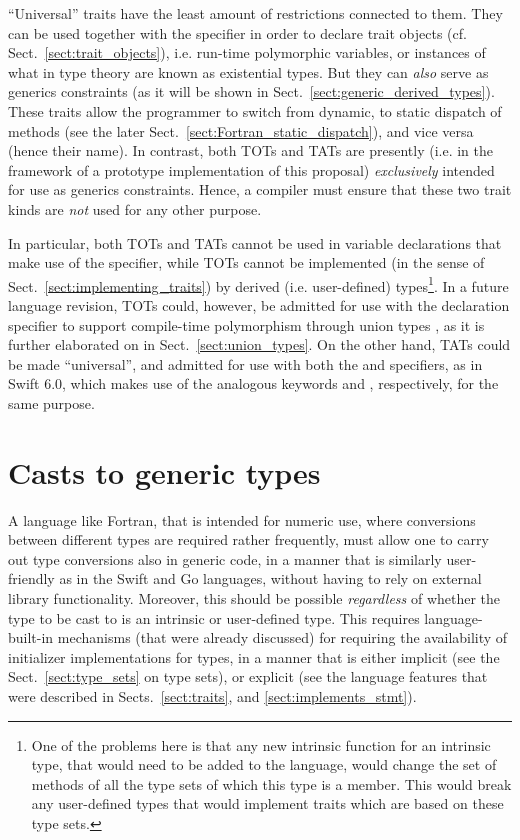 \documentclass[11pt,oneside]{report}
\newcommand{\code}[1]{{\selectfont\ttfamily{#1}}}
\begin{document}
``Universal'' traits have the least amount of restrictions connected
to them. They can be used together with the \code{class} specifier in
order to declare trait objects (cf. Sect.~\ref{sect:trait_objects}),
i.e. run-time polymorphic variables, or instances of what in type
theory are known as existential types. But they can \emph{also} serve
as generics constraints (as it will be shown in
Sect.~\ref{sect:generic_derived_types}). These traits allow the
programmer to switch from dynamic, to static dispatch of methods (see
the later Sect.~\ref{sect:Fortran_static_dispatch}), and vice versa
(hence their name). In contrast, both TOTs and TATs are presently
(i.e. in the framework of a prototype implementation of this proposal)
\emph{exclusively} intended for use as generics constraints. Hence, a
compiler must ensure that these two trait kinds are \emph{not} used
for any other purpose.

In particular, both TOTs and TATs cannot be used in variable
declarations that make use of the \code{class} specifier, while TOTs
cannot be implemented (in the sense of
Sect.~\ref{sect:implementing_traits}) by derived (i.e. user-defined)
types\footnote{One of the problems here is that any new intrinsic
function for an intrinsic type, that would need to be added to the
language, would change the set of methods of all the type sets of
which this type is a member. This would break any user-defined types
that would implement traits which are based on these type sets.}. In a
future language revision, TOTs could, however, be admitted for use
with the \code{type} declaration specifier to support compile-time
polymorphism through union types \cite{Taylor_21,Pierce_91}, as it is
further elaborated on in Sect.~\ref{sect:union_types}. On the other
hand, TATs could be made ``universal'', and admitted for use with both
the \code{class} and \code{type} specifiers, as in Swift 6.0, which
makes use of the analogous keywords \code{any} and \code{some},
respectively, for the same purpose.

\section{Casts to generic types}

A language like Fortran, that is intended for numeric use, where
conversions between different types are required rather frequently,
must allow one to carry out type conversions also in generic code, in
a manner that is similarly user-friendly as in the Swift and Go
languages, without having to rely on external library
functionality. Moreover, this should be possible \emph{regardless} of
whether the type to be cast to is an intrinsic or user-defined
type. This requires language-built-in mechanisms (that were already
discussed) for requiring the availability of initializer
implementations for types, in a manner that is either implicit (see
the Sect.~\ref{sect:type_sets} on type sets), or explicit (see the
language features that were described in Sects.~\ref{sect:traits},
and \ref{sect:implements_stmt}).
\end{document}

